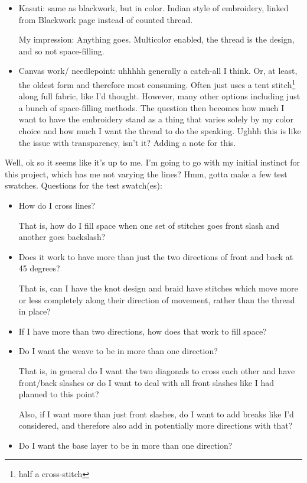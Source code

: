 \documentclass[12pt]{article}
\renewcommand{\,}{\textsuperscript{,}}
\begin{document}
\begin{itemize}
\begin{itemize}
\begin{itemize}
\begin{itemize}
My impression: Anything goes, size or direction can change. Monochrome and doesn't fill in the full space.

\item Kasuti: same as blackwork, but in color.
Indian style of embroidery, linked from Blackwork page instead of counted thread.

My impression: Anything goes. Multicolor enabled, the thread is the design, and so not space-filling.

\item Canvas work/ needlepoint: uhhhhh generally a catch-all I think.
Or, at least, the oldest form and therefore most consuming.
Often just uses a tent stitch\footnote{half a cross-stitch} along full fabric, like I'd thought.
However, many other options including just a bunch of space-filling methods.
The question then becomes how much I want to have the embroidery stand as a thing that varies solely by my color choice and how much I want the thread to do the speaking.
Ughhh this is like the issue with transparency, isn't it?
Adding a note for this.

\end{itemize}

Well, ok so it seems like it's up to me.
I'm going to go with my initial instinct for this project, which has me not varying the lines?
Hmm, gotta make a few test swatches. Questions for the test swatch(es):

\begin{itemize}
\item How do I cross lines? 

That is, how do I fill space when one set of stitches goes front slash and another goes backslash?
\item Does it work to have more than just the two directions of front and back at 45 degrees? 

That is, can I have the knot design and braid have stitches which move more or less completely along their direction of movement, rather than the thread in place?
\item If I have more than two directions, how does that work to fill space?
\item Do I want the weave to be in more than one direction?

That is, in general do I want the two diagonals to cross each other and have front/back slashes or do I want to deal with all front slashes like I had planned to this point?

Also, if I want more than just front slashes, do I want to add breaks like I'd considered, and therefore also add in potentially more directions with that?
\item Do I want the base layer to be in more than one direction?


\end{itemize}
\end{itemize}
\end{itemize}
\end{itemize}
\end{document}
